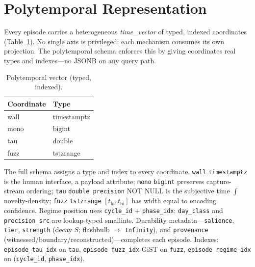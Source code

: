 \documentclass[letterpaper]{article}
\begin{document}
\section{Polytemporal Representation}
Every episode carries a heterogeneous \emph{time\_vector} of typed, indexed coordinates (Table~\ref{tab:polytemporal}). No single axis is privileged; each mechanism consumes its own projection. The polytemporal schema enforces this by giving coordinates real types and indexes---no JSONB on any query path.

\begin{table}[t]\centering\begin{tabular}{ll}\toprule Coordinate & Type \\ \midrule wall & timestamptz \\ mono & bigint \\ tau & double \\ fuzz & tstzrange \\ \bottomrule\end{tabular}\caption{Polytemporal vector (typed, indexed).}\label{tab:polytemporal}\end{table}

The full schema assigns a type and index to every coordinate. \texttt{wall} \texttt{timestamptz} is the human interface, a payload attribute; \texttt{mono} \texttt{bigint} preserves capture-stream ordering; \texttt{tau} \texttt{double precision} NOT NULL is the subjective time $\int$ novelty-density; \texttt{fuzz} \texttt{tstzrange} $[t_{\text{lo}},t_{\text{hi}}]$ has width equal to encoding confidence. Regime position uses \texttt{cycle\_id} + \texttt{phase\_idx}; \texttt{day\_class} and \texttt{precision\_src} are lookup-typed smallints. Durability metadata---\texttt{salience}, \texttt{tier}, \texttt{strength} (decay $S$; flashbulb $\Rightarrow$ \texttt{Infinity}), and \texttt{provenance} (witnessed/boundary/reconstructed)---completes each episode. Indexes: \texttt{episode\_tau\_idx} on \texttt{tau}, \texttt{episode\_fuzz\_idx} GiST on \texttt{fuzz}, \texttt{episode\_regime\_idx} on (\texttt{cycle\_id}, \texttt{phase\_idx}).
\end{document}
